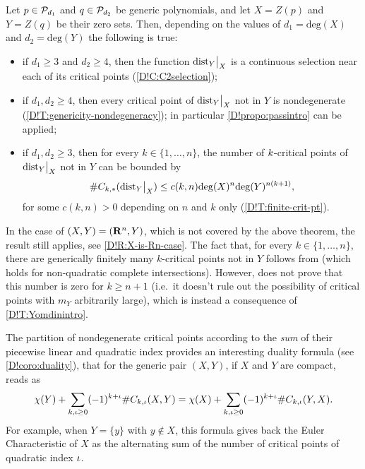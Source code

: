 \begin{theorem}
\label{D!T:finite-crit-ptintro}
  Let $p \in \mathcal{P}_{d_1}$ and $q\in \mathcal{P}_{d_2}$ be generic polynomials, and let $X = Z(p)$ and $Y = Z(q)$ be their zero sets. Then, depending on the values of $d_1=\mathrm{deg}(X)$ and $d_2=\mathrm{deg}(Y)$ the following is true:
  \begin{itemize}
    \item[-] if $d_1 \geq 3$ and $d_2 \geq 4$, then the function $\mathord{\operatorname{dist}}_Y\big|_X$ is a continuous selection near each of its critical points (\cref{D!C:C2selection});
    \item[-] if $d_1, d_2 \geq 4$, then every critical point of $\mathord{\operatorname{dist}}_Y\big|_X$ not in $Y$ is nondegenerate (\cref{D!T:genericity-nondegeneracy}); in particular \cref{D!propo:passintro} can be applied;
    \item[-] if $d_1, d_2 \geq 3$, then for every $k\in \{1, \ldots, n\}$, the number of $k$-critical points of $\mathord{\operatorname{dist}}_Y\big|_X$ not in $Y$ can be bounded by
    \begin{equation}
      \label{D!eq:boundcriticalintro}\#C_{k, *}(\mathord{\operatorname{dist}}_Y\big|_X)\leq c(k,n)\mathrm{deg}(X)^n\mathrm{deg}(Y)^{n(k+1)},
    \end{equation}
    for some $c(k,n)>0$ depending on $n$ and $k$ only (\cref{D!T:finite-crit-pt}).
  \end{itemize}
\end{theorem}

\begin{remark}
  In the case of $(X, Y) = (\mathbf{R}^n, Y)$, which is not covered by the above theorem,  the result still applies, see \cref{D!R:X-is-Rn-case}. The fact that, for every $k \in \{1, \ldots, n\}$, there are generically finitely many $k$-critical points not in $Y$ follows from \cite[Theorem 4.14]{DEEGH2023} (which holds for non-quadratic complete intersections). However, \cite[Theorem 4.14]{DEEGH2023} does not prove that this number is zero for $k\ge n+1$ (i.e.\ it doesn't rule out the possibility of critical points with $m_Y$ arbitrarily large), which is instead a consequence of \cref{D!T:Yomdinintro}. 
\end{remark}

\begin{remark}
  The partition of nondegenerate critical points according to the \textit{sum} of their piecewise linear and quadratic index provides an interesting duality formula (see \cref{D!coro:duality}), that for the generic pair $(X, Y)$, if $X$ and $Y$ are compact, reads as
  \[
    \chi(Y)+\sum_{k, \iota\geq 0}(-1)^{k + \iota}\#C_{k, \iota}(X, Y)=\chi(X)+\sum_{k, \iota\geq 0}(-1)^{k + \iota}\#C_{k, \iota}(Y, X).
  \]
  For example, when $Y=\{y\}$ with $y \notin X$, this formula gives back the Euler Characteristic of $X$ as the alternating sum of the number of critical points of quadratic index $\iota$.
\end{remark}


